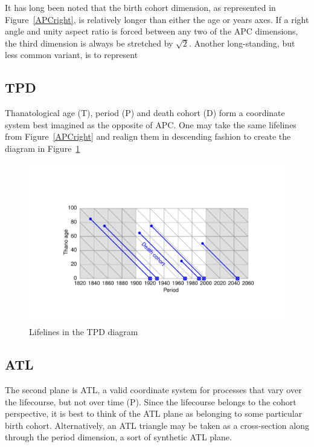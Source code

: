 \documentclass[onehalfspacing]{article}
\begin{document}
It has long been noted \citep{zeuner1869abhandlungen, perozzo1880della} that the
birth cohort dimension, as represented in Figure~\ref{APCright}, is relatively
longer than either the age or years axes. If a right angle and unity aspect
ratio is forced between any two of the APC dimensions, the third dimension is always be
stretched by $\sqrt{2}$. Another long-standing, but less common variant, is to
represent

\FloatBarrier

\subsection*{TPD}

Thanatological age (T), period (P) and death cohort (D) form a coordinate system
best imagined as the opposite of APC. One may take the same lifelines from
Figure~\ref{APCright} and realign them in descending fashion to create the
diagram in Figure~\ref{TPDright}

\begin{figure}[b!]
    \centering
    \includegraphics[scale=.7]{Figures/LabPres/TPD2.pdf}
    \caption{Lifelines in the TPD diagram}
    \label{TPDright}
\end{figure} 

\subsection*{ATL}
The second plane is ATL, a valid coordinate system for
processes that vary over the lifecourse, but not over time (P). Since the
lifecourse belongs to the cohort perspective, it is best to think of the ATL
plane as belonging to some particular birth cohort. Alternatively, an ATL
triangle may be taken as a cross-section along through the period dimension, a
sort of synthetic ATL plane.
\end{document}
